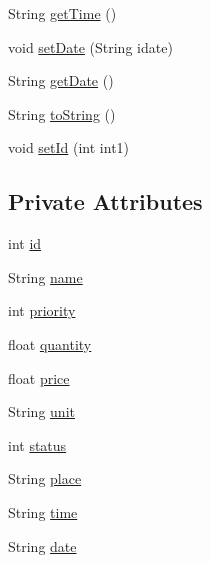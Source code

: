 \begin{DoxyCompactItemize}
\item 
String \hyperlink{classvip2012_1_1g07_1_1shoppinglist_1_1Item_a900d6e82e989377b86cd1d6491a50180}{get\-Time} ()
\item 
void \hyperlink{classvip2012_1_1g07_1_1shoppinglist_1_1Item_a2146a4bd71bdf972a6987a458c4c6c26}{set\-Date} (String idate)
\item 
String \hyperlink{classvip2012_1_1g07_1_1shoppinglist_1_1Item_acc20fcd26ddd99b881506aa2ac5d771d}{get\-Date} ()
\item 
String \hyperlink{classvip2012_1_1g07_1_1shoppinglist_1_1Item_a753617f235595034b888c8789a263a5c}{to\-String} ()
\item 
void \hyperlink{classvip2012_1_1g07_1_1shoppinglist_1_1Item_af5c4866d94939c403a91ba49f2b6d621}{set\-Id} (int int1)
\end{DoxyCompactItemize}
\subsection*{Private Attributes}
\begin{DoxyCompactItemize}
\item 
int \hyperlink{classvip2012_1_1g07_1_1shoppinglist_1_1Item_a8476e453fe531e472af605a23982101a}{id}
\item 
String \hyperlink{classvip2012_1_1g07_1_1shoppinglist_1_1Item_aee17888b6e1d30bce7a81aaffe6f053d}{name}
\item 
int \hyperlink{classvip2012_1_1g07_1_1shoppinglist_1_1Item_ac1ca4e71eccba9e5e100c9a45daca8df}{priority}
\item 
float \hyperlink{classvip2012_1_1g07_1_1shoppinglist_1_1Item_adaeae2e873d9f91312553f61ba6f8de6}{quantity}
\item 
float \hyperlink{classvip2012_1_1g07_1_1shoppinglist_1_1Item_a52428d91c54c43ccf1394efb3b1da5f3}{price}
\item 
String \hyperlink{classvip2012_1_1g07_1_1shoppinglist_1_1Item_a3d919fb6d4c95e347f5c00c12436948f}{unit}
\item 
int \hyperlink{classvip2012_1_1g07_1_1shoppinglist_1_1Item_a5c56e93b88819efd504f517868274de3}{status}
\item 
String \hyperlink{classvip2012_1_1g07_1_1shoppinglist_1_1Item_a4797cd0f0a38d957689314e8e1691b86}{place}
\item 
String \hyperlink{classvip2012_1_1g07_1_1shoppinglist_1_1Item_a4b3f6f3899f0211bf3e6532ed607b710}{time}
\item 
String \hyperlink{classvip2012_1_1g07_1_1shoppinglist_1_1Item_ad058fdff8f1e5fe4d8cb9db18df8bf7b}{date}
\end{DoxyCompactItemize}


